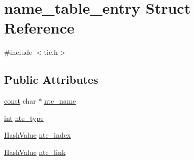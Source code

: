 \hypertarget{structname__table__entry}{\section{name\-\_\-table\-\_\-entry Struct Reference}
\label{structname__table__entry}
}


{\ttfamily \#include $<$tic.\-h$>$}

\subsection*{Public Attributes}
\begin{DoxyCompactItemize}
\item 
\hyperlink{term__entry_8h_a57bd63ce7f9a353488880e3de6692d5a}{const} char $\ast$ \hyperlink{structname__table__entry_a0972321622fb9e4d8807f5bd6de99e43}{nte\-\_\-name}
\item 
\hyperlink{term__entry_8h_ad65b480f8c8270356b45a9890f6499ae}{int} \hyperlink{structname__table__entry_a28f0c39889aef0dd78cfe96bb8d83d2f}{nte\-\_\-type}
\item 
\hyperlink{tic_8h_a0abca0b033672183ce7cbf1d4e18f4ce}{Hash\-Value} \hyperlink{structname__table__entry_aafb4b3f2a851f29d70b975e268fbec22}{nte\-\_\-index}
\item 
\hyperlink{tic_8h_a0abca0b033672183ce7cbf1d4e18f4ce}{Hash\-Value} \hyperlink{structname__table__entry_afd9aef695fb85dd7de2bd7d0390c0af8}{nte\-\_\-link}
\end{DoxyCompactItemize}


